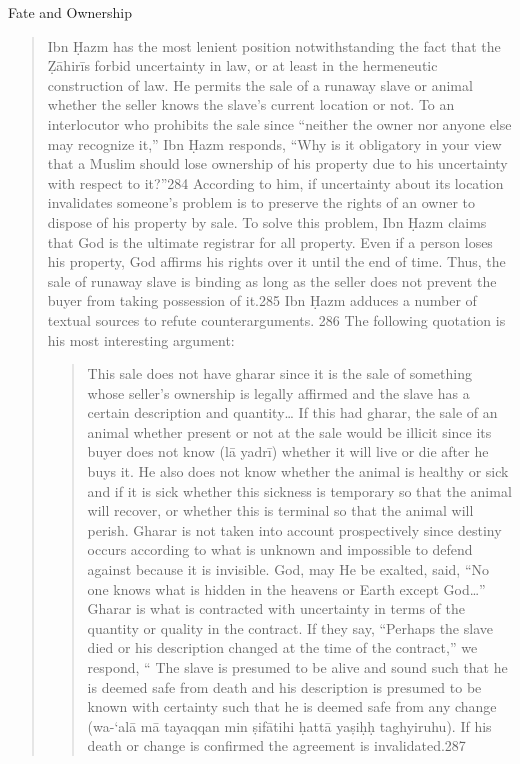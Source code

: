  Fate and Ownership
\begin{quote}
    
Ibn Ḥazm has the most lenient position notwithstanding the fact that the Ẓāhirīs
forbid uncertainty in law, or at least in the hermeneutic construction of law. He permits
the sale of a runaway slave or animal whether the seller knows the slave’s current
location or not. To an interlocutor who prohibits the sale since “neither the owner nor
anyone else may recognize it,” Ibn Ḥazm responds, “Why is it obligatory in your view
that a Muslim should lose ownership of his property due to his uncertainty with respect to
it?”284 According to him, if uncertainty about its location invalidates someone’s problem is to preserve the rights of an owner to dispose
of his property by sale. To solve this problem, Ibn Ḥazm claims that God is the ultimate
registrar for all property. Even if a person loses his property, God affirms his rights over
it until the end of time. Thus, the sale of runaway slave is binding as long as the seller
does not prevent the buyer from taking possession of it.285 Ibn Ḥazm adduces a number of
textual sources to refute counterarguments. 286 The following quotation is his most
interesting argument:
\begin{quote}
    This sale does not have gharar since it is the sale of something
whose seller’s ownership is legally affirmed and the slave has a
certain description and quantity… If this had gharar, the sale of
an animal whether present or not at the sale would be illicit since
its buyer does not know (lā yadrī) whether it will live or die after
he buys it. He also does not know whether the animal is healthy
or sick and if it is sick whether this sickness is temporary so that
the animal will recover, or whether this is terminal so that the
animal will perish. Gharar is not taken into account
prospectively since destiny occurs according to what is unknown
and impossible to defend against because it is invisible. God,
may He be exalted, said, “No one knows what is hidden in the
heavens or Earth except God…” Gharar is what is contracted
with uncertainty in terms of the quantity or quality in the
contract. If they say, “Perhaps the slave died or his description
changed at the time of the contract,” we respond, “ The slave is
presumed to be alive and sound such that he is deemed safe from
death and his description is presumed to be known with certainty
such that he is deemed safe from any change (wa-‘alā mā
tayaqqan min ṣifātihi ḥattā yaṣiḥḥ taghyiruhu). If his death or
change is confirmed the agreement is invalidated.287
\end{quote}


\end{quote}
